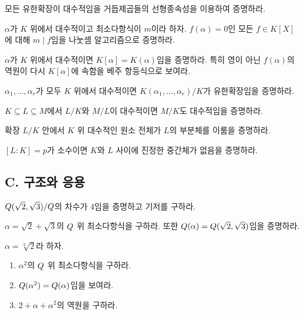 \begin{exercise}
모든 유한확장이 대수적임을 거듭제곱들의 선형종속성을 이용하여 증명하라.
\end{exercise}

\begin{exercise}[*]
$\alpha$가 $K$ 위에서 대수적이고 최소다항식이 $m$이라 하자. $f(\alpha)=0$인 모든 $f\in K[X]$에 대해 $m\mid f$임을 나눗셈 알고리즘으로 증명하라.
\end{exercise}

\begin{exercise}[*]
$\alpha$가 $K$ 위에서 대수적이면 $K[\alpha]=K(\alpha)$임을 증명하라. 특히 영이 아닌 $f(\alpha)$의 역원이 다시 $K[\alpha]$에 속함을 베주 항등식으로 보여라.
\end{exercise}

\begin{exercise}
$\alpha_1,\dots,\alpha_r$가 모두 $K$ 위에서 대수적이면 $K(\alpha_1,\dots,\alpha_r)/K$가 유한확장임을 증명하라.
\end{exercise}

\begin{exercise}[*]
$K\subseteq L\subseteq M$에서 $L/K$와 $M/L$이 대수적이면 $M/K$도 대수적임을 증명하라.
\end{exercise}

\begin{exercise}
확장 $L/K$ 안에서 $K$ 위 대수적인 원소 전체가 $L$의 부분체를 이룸을 증명하라.
\end{exercise}

\begin{exercise}
$[L:K]=p$가 소수이면 $K$와 $L$ 사이에 진정한 중간체가 없음을 증명하라.
\end{exercise}

\subsection*{C. 구조와 응용}

\begin{exercise}[*]
$Q(\sqrt2,\sqrt3)/Q$의 차수가 $4$임을 증명하고 기저를 구하라.
\end{exercise}

\begin{exercise}[*]
$\alpha=\sqrt2+\sqrt3$의 $Q$ 위 최소다항식을 구하라. 또한 $Q(\alpha)=Q(\sqrt2,\sqrt3)$임을 증명하라.
\end{exercise}

\begin{exercise}[*]
$\alpha=\sqrt[3]{2}$라 하자.
\begin{enumerate}[label=(\alph*)]
  \item $\alpha^2$의 $Q$ 위 최소다항식을 구하라.
  \item $Q(\alpha^2)=Q(\alpha)$임을 보여라.
  \item $2+\alpha+\alpha^2$의 역원을 구하라.
\end{enumerate}
\end{exercise}

